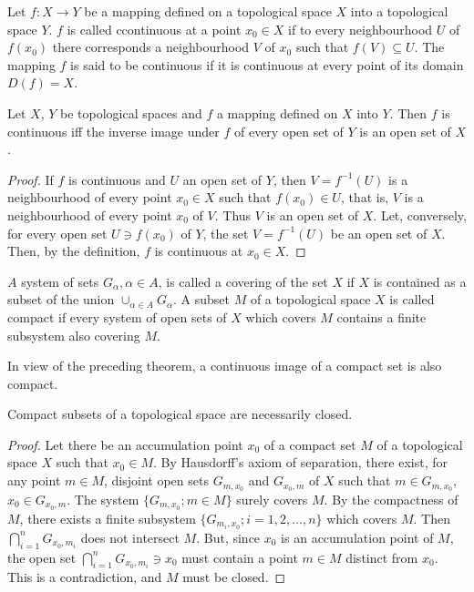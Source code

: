 
\begin{definitionu} Let $f: X \to Y$ be a mapping defined on a topological space $X$ into a topological space $Y$. $f$ is called ccontinuous at a point $x_0 \in X$ if to every neighbourhood $U$ of $f(x_0)$ there corresponds a neighbourhood $V$ of $x_0$ such that $f(V) \subseteq U$. The mapping $f$ is said to be continuous if it is continuous at every point of its domain $D(f) = X$. 
\end{definitionu}

\begin{theoremu} Let $X$, $Y$ be topological spaces and $f$ a mapping defined on $X$ into $Y$. Then $f$ is continuous iff the inverse image under $f$ of every open set of $Y$ is an open set of $X$. 
\end{theoremu}

\begin{proof}
 If $f$ is continuous and $U$ an open set of $Y$, then $V = f^{-1}(U)$ is a neighbourhood of every point $x_0 \in X$ such that $f(x_0) \in U$, that is, $V$ is a neighbourhood of every point $x_0$ of $V$. Thus $V$ is an open set of $X$. Let, conversely, for every open set $U \ni f(x_0)$ of $Y$, the set $V = f^{-1}(U)$ be an open set of $X$. Then, by the definition, $f$ is continuous at $x_0 \in X$. 
\end{proof}


\begin{definitionu} $A$ system of sets $G_{\alpha}, \alpha \in A$, is called a covering of the set $X$ if $X$ is contained as a subset of the union $\cup_{\alpha \in A} G_{\alpha}$. A subset $M$ of a topological space $X$ is called compact if every system of open sets of $X$ which covers $M$ contains a finite subsystem also covering $M$. 
\end{definitionu}

In view of the preceding theorem, a continuous image of a compact set is also compact. 

\begin{proposition}\label{prop:0.2.Proposition.1} Compact subsets of a topological space are necessarily closed. 
\end{proposition}

\begin{proof}
 Let there be an accumulation point $x_0$ of a compact set $M$ of a topological space $X$ such that $x_0 \in M$. By Hausdorff's axiom of separation, there exist, for any point $m \in M$, disjoint open sets $G_{m,x_0}$ and $G_{x_0,m}$ of $X$ such that $m \in G_{m,x_0}$, $x_0 \in G_{x_0,m}$. The system $\{G_{m,x_0}; m \in M\}$ surely covers $M$. By the compactness of $M$, there exists a finite subsystem $\{G_{m_i,x_0}; i = 1,2,\ldots,n\}$ which covers $M$. Then $\bigcap\limits_{i=1}^{n} G_{x_0,m_i}$ does not intersect $M$. But, since $x_0$ is an accumulation point of $M$, the open set $\bigcap\limits_{i=1}^{n} G_{x_0,m_i} \ni x_0$ must contain a point $m \in M$ distinct from $x_0$. This is a contradiction, and $M$ must be closed. 
\end{proof}

